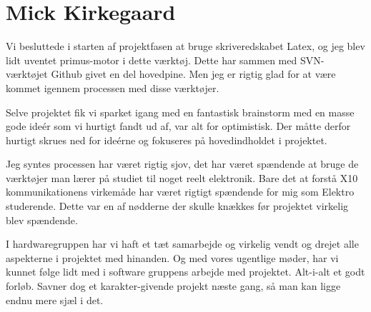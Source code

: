 \section{Mick Kirkegaard}
Vi besluttede i starten af projektfasen at bruge skriveredskabet Latex, og jeg blev lidt 
uventet primus-motor i dette værktøj. Dette har sammen med SVN-værktøjet Github givet en 
del hovedpine. Men jeg er rigtig glad for at være kommet igennem processen med disse værktøjer.

Selve projektet fik vi sparket igang med en fantastisk brainstorm med en masse gode ideér
som vi hurtigt fandt ud af, var alt for optimistisk. Der måtte derfor hurtigt skrues
ned for ideérne og fokuseres på hovedindholdet i projektet.

Jeg syntes processen har været rigtig sjov, det har været spændende at bruge de værktøjer
man lærer på studiet til noget reelt elektronik. Bare det at forstå X10 kommunikationens
virkemåde har været rigtigt spændende for mig som Elektro studerende. Dette var en af nødderne
der skulle knækkes før projektet virkelig blev spændende.

I hardwaregruppen har vi haft et tæt samarbejde og virkelig vendt og drejet alle aspekterne
i projektet med hinanden. Og med vores ugentlige møder, har vi kunnet følge lidt med i 
software gruppens arbejde med projektet. Alt-i-alt et godt forløb. Savner dog et karakter-givende
projekt næste gang, så man kan ligge endnu mere sjæl i det.